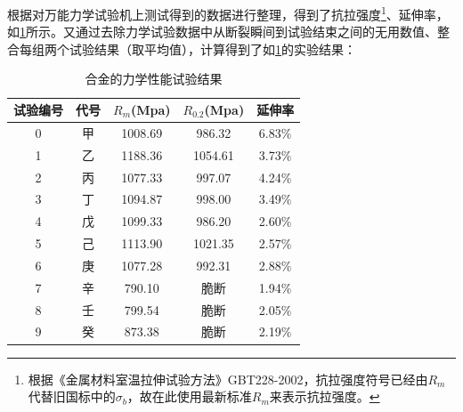 根据对万能力学试验机上测试得到的数据进行整理，得到了抗拉强度\footnote{根据《金属材料室温拉伸试验方法》GBT228-2002，抗拉强度符号已经由$ R_m $代替旧国标中的$ \sigma_b $，故在此使用最新标准$ R_m $来表示抗拉强度。}、延伸率，如\ref{sec:mystrength}所示。又通过去除力学试验数据中从断裂瞬间到试验结束之间的无用数值、整合每组两个试验结果（取平均值），计算得到了如\ref{sec:mystrength}的实验结果：
\begin{table}[htbp]
	\centering
	\caption{\ti 合金的力学性能试验结果}
	\label{sec:mystrength}
	\begin{tabular}{ccccc}
		\toprule
		试验编号& 代号&$ R_m $(Mpa)&$ R_0.2 $(Mpa)&延伸率 \\
		\midrule
		0 & 甲 & 1008.69 &986.32& 6.83$\%$ \\
		1 & 乙 & 1188.36 &1054.61 &3.73$\%$ \\
		2 & 丙 & 1077.33 & 997.07&4.24$\%$ \\
		3 & 丁 & 1094.87 & 998.00&3.49$\%$ \\
		4 & 戊 & 1099.33 &986.20 &2.60$\%$ \\
		5 & 己 & 1113.90 & 1021.35&2.57$\%$ \\
		6 & 庚 & 1077.28 &992.31& 2.88$\%$ \\
		7 & 辛 & 790.10 & 脆断&1.94$\%$ \\
		8 & 壬 & 799.54 &脆断& 2.05$\%$ \\
		9 & 癸 & 873.38 & 脆断&2.19$\%$ \\
		\bottomrule
	\end{tabular}
\end{table}

